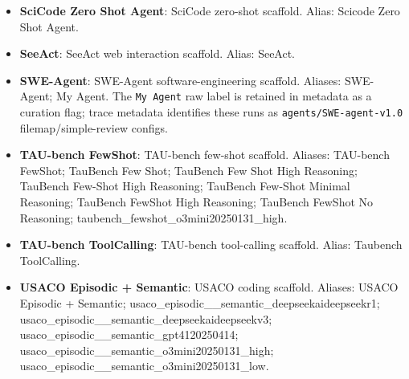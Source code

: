 \begin{itemize}
\item \textbf{SciCode Zero Shot Agent}: SciCode zero-shot scaffold. Alias: Scicode Zero Shot Agent.
\item \textbf{SeeAct}: SeeAct web interaction scaffold. Alias: SeeAct.
\item \textbf{SWE-Agent}: SWE-Agent software-engineering scaffold. Aliases: SWE-Agent; My Agent. The \texttt{My Agent} raw label is retained in metadata as a curation flag; trace metadata identifies these runs as \texttt{agents/SWE-agent-v1.0} filemap/simple-review configs.
\item \textbf{TAU-bench FewShot}: TAU-bench few-shot scaffold. Aliases: TAU-bench FewShot; TauBench Few Shot; TauBench Few Shot High Reasoning; TauBench Few-Shot High Reasoning; TauBench Few-Shot Minimal Reasoning; TauBench FewShot High Reasoning; TauBench FewShot No Reasoning; taubench\_fewshot\_o3mini20250131\_high.
\item \textbf{TAU-bench ToolCalling}: TAU-bench tool-calling scaffold. Alias: Taubench ToolCalling.
\item \textbf{USACO Episodic + Semantic}: USACO coding scaffold. Aliases: USACO Episodic + Semantic; usaco\_episodic\_\_semantic\_deepseekaideepseekr1; usaco\_episodic\_\_semantic\_deepseekaideepseekv3; usaco\_episodic\_\_semantic\_gpt4120250414; usaco\_episodic\_\_semantic\_o3mini20250131\_high; usaco\_episodic\_\_semantic\_o3mini20250131\_low.
\end{itemize}
\endgroup
